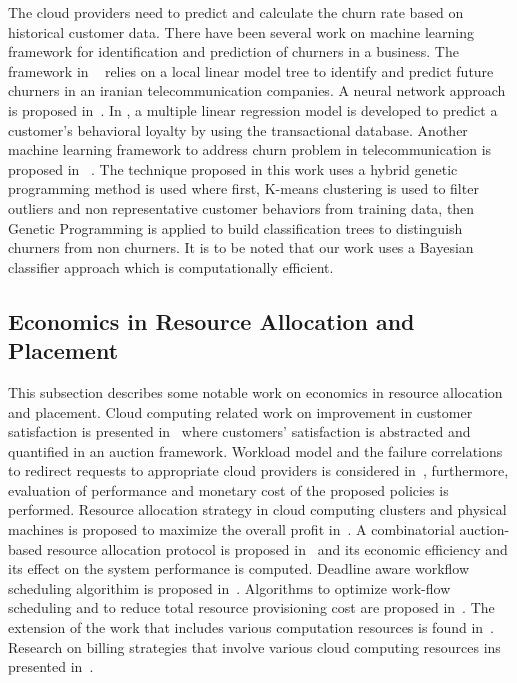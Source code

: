 The cloud providers need to predict and calculate the churn rate based on historical customer data. There have been several work on machine learning framework for identification and prediction of churners in a business. The framework in ~\cite{fasanghari2011customer} relies on a local linear model tree to identify and predict future churners in an iranian telecommunication companies. A neural network approach is proposed in~\cite{hadden2008customer}. In \cite{buckinx2007predicting}, a multiple linear regression model is developed to predict a customer’s behavioral loyalty by using the transactional database. 
Another machine learning framework to address churn problem in telecommunication is proposed in~\cite{obiedat2013customer}       .  The technique proposed in this work uses a hybrid genetic programming method is used where first, K-means  clustering  is used  to  filter outliers and non  representative  customer  behaviors  from training data, then Genetic  Programming  is  applied  to 
build classification trees to distinguish churners from  non  churners. It is to be noted that our work uses a Bayesian classifier approach which is computationally efficient.
 
\subsection{Economics in Resource Allocation and Placement}
This subsection describes some notable work on economics in resource allocation and placement. Cloud computing related work on improvement in customer satisfaction is presented in~\cite{chen2011tradeoffs} where customers’ satisfaction is abstracted and quantified in an auction framework.  Workload model and the failure correlations to redirect requests to appropriate cloud providers is considered in~\cite{javadi2012hybrid}, furthermore, evaluation of performance and monetary cost of the proposed policies is performed. Resource allocation strategy in cloud computing clusters and physical machines is proposed to maximize the overall profit in~\cite{goudarzi2011maximizing}. A combinatorial auction-based resource allocation protocol is proposed in~\cite{das2005combinatorial} and its economic efficiency and its effect on the system performance is computed. Deadline aware workflow scheduling algorithim is proposed in~\cite{abrishami2013deadline}. Algorithms to optimize work-flow scheduling and to reduce total resource provisioning cost are proposed in~\cite{chaisiri2010robust}. The extension of the work that includes various computation resources is found in~\cite{chaisiri2012optimization}. Research on billing strategies that involve various cloud computing resources ins presented in~\cite{li2012research}.

